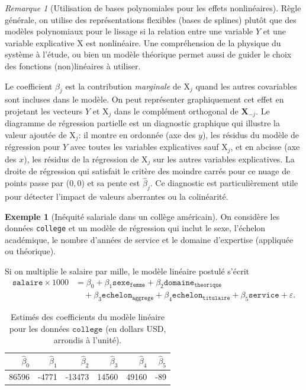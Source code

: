 \documentclass[
  11pt,
  letterpaper,
]{article}
\theoremstyle{definition}
\theoremstyle{definition}
\newtheorem{example}{Exemple}[section]
\theoremstyle{definition}
\theoremstyle{definition}
\theoremstyle{remark}
\newtheorem*{remark}{Remarque}
\begin{document}
\begin{remark}[Utilisation de bases polynomiales pour les effets nonlinéaires]
Règle générale, on utilise des représentations flexibles (bases de splines) plutôt que des modèles polynomiaux pour le lissage si la relation entre une variable \(Y\) et une variable explicative \(\mathrm{X}\) est nonlinéaire. Une compréhension de la physique du système à l'étude, ou bien un modèle théorique permet aussi de guider le choix des fonctions (non)linéaires à utiliser.
\end{remark}

Le coefficient \(\beta_j\) est la contribution
\emph{marginale} de \(\mathrm{X}_j\) quand les autres covariables sont incluses dans le modèle. On peut représenter graphiquement cet effet en projetant les vecteurs \(Y\) et \(\mathrm{X}_j\) dans le complément orthogonal de \(\mathbf{X}_{-j}\). Le diagramme de régression partielle est un diagnostic graphique qui illustre la valeur ajoutée de \(\mathrm{X}_j\): il montre en ordonnée (axe des \(y\)), les résidus du modèle de régression pour \(Y\) avec toutes les variables explicatives sauf \(\mathrm{X}_j\), et en abcisse (axe des \(x\)), les résidus de la régression de \(\mathrm{X}_j\) sur les autres variables explicatives. La droite de régression qui satisfait le critère des moindre carrés pour ce nuage de points passe par (\(0,0\)) et sa pente est \(\hat{\beta}_j\). Ce diagnostic est particulièrement utile pour détecter l'impact de valeurs aberrantes ou la colinéarité.

\begin{example}[Inéquité salariale dans un collège américain]
\protect\hypertarget{exm:inequite-salariale}{}\label{exm:inequite-salariale}On considère les données \texttt{college} et un modèle de régression qui inclut le sexe, l'échelon académique, le nombre d'années de service et le domaine d'expertise (appliquée ou théorique).
\end{example}

Si on multiplie le salaire par mille, le modèle linéaire postulé s'écrit
\begin{align*}
\texttt{salaire} \times 1000 &= \beta_0 + \beta_1 \texttt{sexe}_{\texttt{femme}} +\beta_2 \texttt{domaine}_{\texttt{theorique}} \\&\quad +\beta_3 \texttt{echelon}_{\texttt{aggrege}}
+\beta_4 \texttt{echelon}_{\texttt{titulaire}}  +\beta_5 \texttt{service} + \varepsilon.
\end{align*}

\begin{table}

\caption{\label{tab:collegecoefs}Estimés des coefficients du modèle linéaire pour les données $\texttt{college}$ (en dollars USD, arrondis à l'unité).}
\centering
\begin{tabular}[t]{rrrrrr}
\toprule
$\widehat{\beta}_0$ & $\widehat{\beta}_1$ & $\widehat{\beta}_2$ & $\widehat{\beta}_3$ & $\widehat{\beta}_4$ & $\widehat{\beta}_5$\\
\midrule
86596 & -4771 & -13473 & 14560 & 49160 & -89\\
\bottomrule
\end{tabular}
\end{table}
\end{document}

